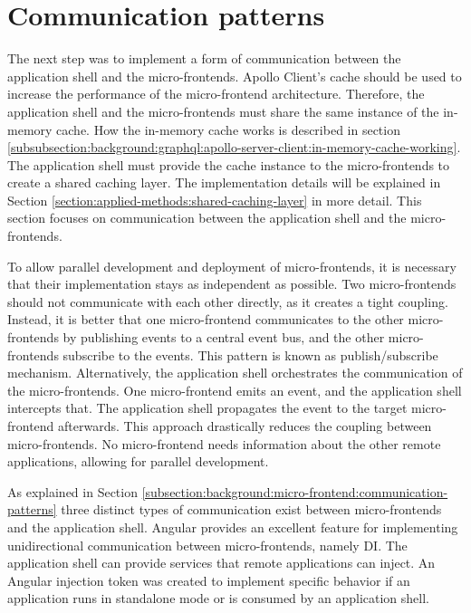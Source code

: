 \section{Communication patterns}\label{section:applied-methods:communication-shell-remote}

The next step was to implement a form of communication between the application shell and the micro-frontends. Apollo Client's cache should be used to increase the performance of the micro-frontend architecture. Therefore, the application shell and the micro-frontends must share the same instance of the in-memory cache. How the in-memory cache works is described in section  \ref{subsubsection:background:graphql:apollo-server-client:in-memory-cache-working}. The application shell must provide the cache instance to the micro-frontends to create a shared caching layer. The implementation details will be explained in Section \ref{section:applied-methods:shared-caching-layer} in more detail. This section focuses on communication between the application shell and the micro-frontends.

\bigskip

\noindent To allow parallel development and deployment of micro-frontends, it is necessary that their implementation stays as independent as possible. Two micro-frontends should not communicate with each other directly, as it creates a tight coupling. Instead, it is better that one micro-frontend communicates to the other micro-frontends by publishing events to a central event bus, and the other micro-frontends subscribe to the events. This pattern is known as publish/subscribe mechanism. Alternatively, the application shell orchestrates the communication of the micro-frontends. One micro-frontend emits an event, and the application shell intercepts that. The application shell propagates the event to the target micro-frontend afterwards. This approach drastically reduces the coupling between micro-frontends. No micro-frontend needs information about the other remote applications, allowing for parallel development.

\bigskip

\noindent As explained in Section \ref{subsection:background:micro-frontend:communication-patterns} three distinct types of communication exist between micro-frontends and the application shell. Angular provides an excellent feature for implementing unidirectional communication between micro-frontends, namely \ac{DI}. The application shell can provide services that remote applications can inject. An Angular injection token was created to implement specific behavior if an application runs in standalone mode or is consumed by an application shell.

